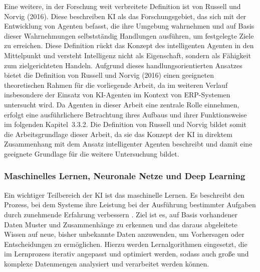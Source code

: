Eine weitere, in der Forschung weit verbreitete Definition ist von Russell und Norvig (2016). Diese beschreiben \ac{KI} als das Forschungsgebiet, das sich mit der Entwicklung von Agenten befasst, die ihre Umgebung wahrnehmen und auf Basis dieser Wahrnehmungen selbstständig Handlungen ausführen, um festgelegte Ziele zu erreichen. \cite[]{russell_artificial_2016} Diese Definition rückt das Konzept des intelligenten Agenten in den Mittelpunkt und versteht Intelligenz nicht als Eigenschaft, sondern als Fähigkeit zum zielgerichteten Handeln. Aufgrund dieses handlungsorientierten Ansatzes bietet die Definition von Russell und Norvig (2016) einen geeigneten theoretischen Rahmen für die vorliegende Arbeit, da im weiteren Verlauf insbesondere der Einsatz von \ac{KI}-Agenten im Kontext von \ac{ERP}-Systemen untersucht wird. Da Agenten in dieser Arbeit eine zentrale Rolle einnehmen, erfolgt eine ausführlichere Betrachtung ihres Aufbaus und ihrer Funktionsweise im folgenden Kapitel~3.3.2. Die Definition von Russell und Norvig bildet somit die Arbeitsgrundlage dieser Arbeit, da sie das Konzept der \ac{KI} in direktem Zusammenhang mit dem Ansatz intelligenter Agenten beschreibt und damit eine geeignete Grundlage für die weitere Untersuchung bildet.

\subsubsection{Maschinelles Lernen, Neuronale Netze und Deep Learning}

Ein wichtiger Teilbereich der \ac{KI} ist das maschinelle Lernen. Es beschreibt den Prozess, bei dem Systeme ihre Leistung bei der Ausführung bestimmter Aufgaben durch zunehmende Erfahrung verbessern \cite[]{mitchell_machine_1997}. Ziel ist es, auf Basis vorhandener Daten Muster und Zusammenhänge zu erkennen und das daraus abgeleitete Wissen auf neue, bisher unbekannte Daten anzuwenden, um Vorhersagen oder Entscheidungen zu ermöglichen. Hierzu werden Lernalgorithmen eingesetzt, die im Lernprozess iterativ angepasst und optimiert werden, sodass auch große und komplexe Datenmengen analysiert und verarbeitet werden können. \cite[]{kreutzer_kunstliche_2023}

